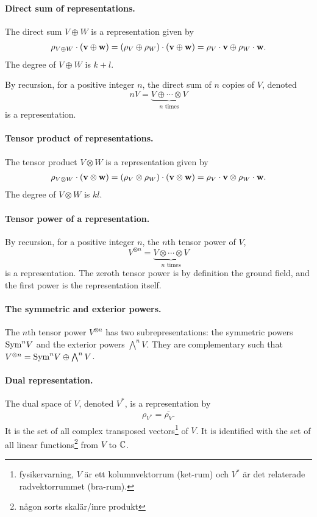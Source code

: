 	\paragraph{Direct sum of representations.} The direct sum $V \oplus W$ is a representation given by
	\begin{align}
		\rho_{V \oplus W}\cdot(\mathbf{v} \oplus \mathbf{w}) = (\rho_V \oplus \rho_W)\cdot(\mathbf{v} \oplus \mathbf{w}) = \rho_V \cdot \mathbf{v} \oplus \rho_W \cdot \mathbf{w}.
	\end{align}
	The degree of $V \oplus W$ is $k+l$.
	
	By recursion, for a positive integer $n$, the direct sum of $n$ copies of $V$, denoted
	\[
		nV = \underset{n \text{ times}}{\underbrace{V \oplus \cdots \otimes V}}
	\]
	is a representation.
	
	\paragraph{Tensor product of representations.} The tensor product $V \otimes W$ is a representation given by
	\begin{align}
		\rho_{V \otimes W}\cdot(\mathbf{v} \otimes \mathbf{w}) = (\rho_V \otimes \rho_W)\cdot(\mathbf{v} \otimes \mathbf{w}) = \rho_V \cdot \mathbf{v} \otimes \rho_W \cdot \mathbf{w}.
	\end{align}
	The degree of $V \otimes W$ is $kl$.
	
	\paragraph{Tensor power of a representation.} By recursion, for a positive integer $n$, the $n$th tensor power of $V$,
	\[
		V^{\otimes n} = \underset{n \text{ times}}{\underbrace{V \otimes \cdots \otimes V}}
	\]
	is a representation. The zeroth tensor power is by definition the ground field, and the first power is the representation itself. 
	
	\paragraph{The symmetric and exterior powers.} The $n$th tensor power $V^{\otimes n}$ has two  subrepresentations: the symmetric powers $\text{Sym}^n V$ and the exterior powers $ \bigwedge^n V$. They are complementary such that $V^{\otimes n} = \text{Sym}^n V \oplus \bigwedge^n V$.
	
	\paragraph{Dual representation.} The dual space of $V$, denoted $V^*$, is a representation by 
	\begin{align}
		\rho_{V^*} = \bar{\rho_V}.
	\end{align}
	It is the set of all complex transposed vectors\footnote{fysikervarning, $V$ är ett kolumnvektorrum (ket-rum) och $V^*$ är det relaterade radvektorrummet (bra-rum).} of $V$. It is identified with the set of all linear functions\footnote{någon sorts skalär/inre produkt} from $V$ to $\mathbb{C}$.
	
